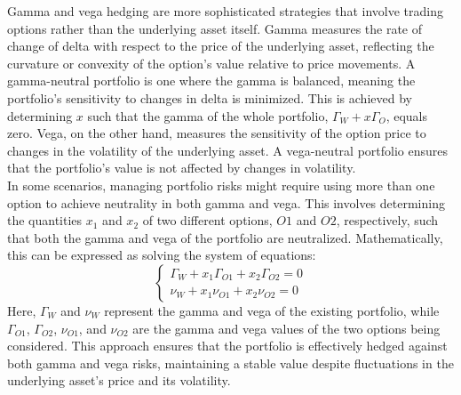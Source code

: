 \documentclass[a4paper,10pt]{article}
\begin{document}
        \noindent Gamma and vega hedging are more sophisticated strategies that involve trading options rather than the underlying asset itself. Gamma measures the rate of change of delta with respect to the price of the underlying asset, reflecting the curvature or convexity of the option’s value relative to price movements. A gamma-neutral portfolio is one where the gamma is balanced, meaning the portfolio’s sensitivity to changes in delta is minimized. This is achieved by determining \(x\) such that the gamma of the whole portfolio, \(\Gamma_W + x \Gamma_O\), equals zero. Vega, on the other hand, measures the sensitivity of the option price to changes in the volatility of the underlying asset. A vega-neutral portfolio ensures that the portfolio’s value is not affected by changes in volatility. \\
        
        \noindent In some scenarios, managing portfolio risks might require using more than one option to achieve neutrality in both gamma and vega. This involves determining the quantities \(x_1\) and \(x_2\) of two different options, \(O1\) and \(O2\), respectively, such that both the gamma and vega of the portfolio are neutralized. Mathematically, this can be expressed as solving the system of equations:
        \[
        \begin{cases} 
        \Gamma_W + x_1 \Gamma_{O1} + x_2 \Gamma_{O2} = 0 \\
        \nu_W + x_1 \nu_{O1} + x_2 \nu_{O2} = 0 
        \end{cases}
        \]
        Here, \(\Gamma_W\) and \(\nu_W\) represent the gamma and vega of the existing portfolio, while \(\Gamma_{O1}\), \(\Gamma_{O2}\), \(\nu_{O1}\), and \(\nu_{O2}\) are the gamma and vega values of the two options being considered. This approach ensures that the portfolio is effectively hedged against both gamma and vega risks, maintaining a stable value despite fluctuations in the underlying asset's price and its volatility. \\
\end{document}
